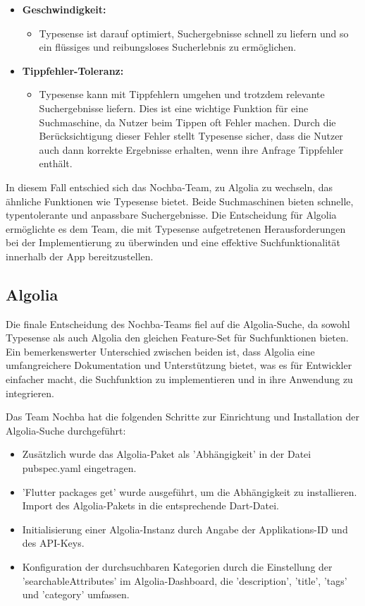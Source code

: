 \begin{itemize}
  \item \textbf{Geschwindigkeit:}
        \begin{itemize}
          \item {Typesense ist darauf optimiert, Suchergebnisse schnell zu liefern und so ein flüssiges und reibungsloses Sucherlebnis zu ermöglichen.}
        \end{itemize}
  \item \textbf{Tippfehler-Toleranz:}
        \begin{itemize}
          \item {Typesense kann mit Tippfehlern umgehen und trotzdem relevante Suchergebnisse liefern. Dies ist eine wichtige Funktion für eine Suchmaschine, da Nutzer beim Tippen oft Fehler machen. Durch die Berücksichtigung dieser Fehler stellt Typesense sicher, dass die Nutzer auch dann korrekte Ergebnisse erhalten, wenn ihre Anfrage Tippfehler enthält.}
        \end{itemize}
\end{itemize}

In diesem Fall entschied sich das Nochba-Team, zu Algolia zu wechseln, das ähnliche Funktionen wie Typesense bietet. Beide Suchmaschinen bieten schnelle, typentolerante und anpassbare Suchergebnisse. Die Entscheidung für Algolia ermöglichte es dem Team, die mit Typesense aufgetretenen Herausforderungen bei der Implementierung zu überwinden und eine effektive Suchfunktionalität innerhalb der App bereitzustellen.

\subsection{Algolia}

Die finale Entscheidung des Nochba-Teams fiel auf die Algolia-Suche, da sowohl Typesense als auch Algolia den gleichen Feature-Set für Suchfunktionen bieten. Ein bemerkenswerter Unterschied zwischen beiden ist, dass Algolia eine umfangreichere Dokumentation und Unterstützung bietet, was es für Entwickler einfacher macht, die Suchfunktion zu implementieren und in ihre Anwendung zu integrieren.

Das Team Nochba hat die folgenden Schritte zur Einrichtung und Installation der Algolia-Suche durchgeführt:

\begin{itemize}
  \item {Zusätzlich wurde das Algolia-Paket als 'Abhängigkeit' in der Datei pubspec.yaml eingetragen.}
  \item {'Flutter packages get' wurde ausgeführt, um die Abhängigkeit zu installieren.
        Import des Algolia-Pakets in die entsprechende Dart-Datei.}
  \item {Initialisierung einer Algolia-Instanz durch Angabe der Applikations-ID und des API-Keys.}
  \item {Konfiguration der durchsuchbaren Kategorien durch die Einstellung der 'searchableAttributes' im Algolia-Dashboard, die 'description', 'title', 'tags' und 'category' umfassen.}
\end{itemize}

